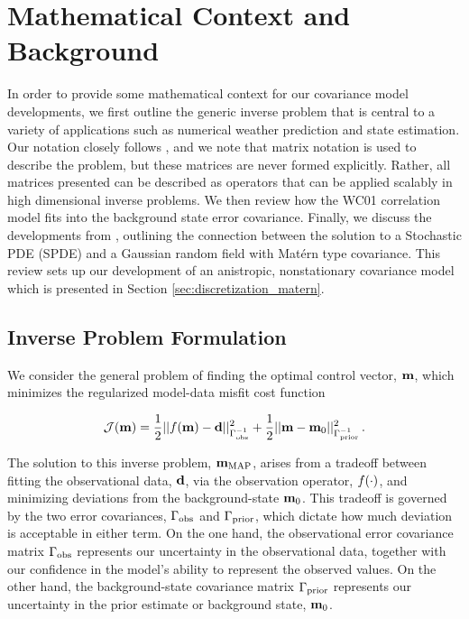 \section{Mathematical Context and Background}
\label{sec:review}

In order to provide some mathematical context for our covariance model
developments, we first outline the generic inverse problem that is central to
a variety of applications such as numerical weather prediction and state
estimation.
Our notation closely follows \citet{ide_unified_1997}, and we note that matrix
notation is used to describe the problem, but these matrices are never formed
explicitly.
Rather, all matrices presented can be described as operators that can be applied
scalably in high dimensional inverse problems.
We then review how the WC01 correlation model fits into the background state
error covariance.
Finally, we discuss the developments from \citet{RSSB:RSSB777}, outlining the
connection between the solution to a Stochastic PDE (SPDE) and a Gaussian random
field with Mat\'ern type covariance.
This review sets up our development of an anistropic, nonstationary covariance
model which is presented in Section \ref{sec:discretization_matern}.


\subsection{Inverse Problem Formulation}
\label{ssec:da_formulation}

We consider the general problem of finding the optimal control vector,
$\mathbf{m}$, which minimizes the regularized model-data misfit cost function
\begin{linenomath*}\begin{equation*}
    \mathcal{J}(\mathbf{m}) =
        \dfrac{1}{2}||f(\mathbf{m}) - \mathbf{d}||_{\Gamma_\text{obs}^{-1}}^2
        +
        \dfrac{1}{2}||\mathbf{m} - \mathbf{m}_{0}||_{\Gamma_{\text{prior}}^{-1}}^2 \, .
\end{equation*}\end{linenomath*}
The solution to this inverse problem, $\mathbf{m}_{\text{MAP}}$, arises from a tradeoff between fitting the
observational data, $\mathbf{d}$, via the observation operator, $f(\cdot)$,
and minimizing deviations from the background-state $\mathbf{m}_{0}$.
This tradeoff is governed by the two error covariances, $\Gamma_\text{obs}$ and
$\Gamma_{\text{prior}}$, which dictate how much deviation is acceptable in either term.
On the one hand, the observational error covariance matrix
$\Gamma_\text{obs}$ represents our uncertainty
in the observational data, together with our confidence in the model's ability
to represent the observed values.
On the other hand, the background-state covariance matrix $\Gamma_{\text{prior}}$
represents our uncertainty in the prior estimate or background state,
$\mathbf{m}_{0}$.

